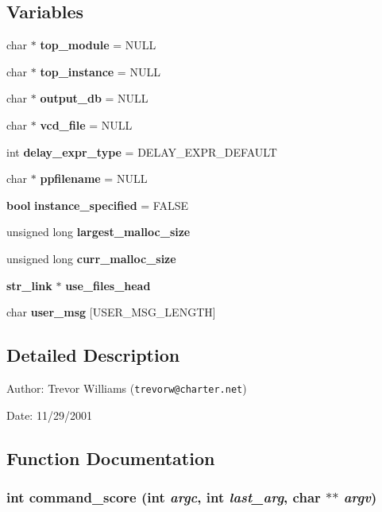 \subsection*{Variables}
\begin{CompactItemize}
\item 
char $\ast$ {\bf top\_\-module} = NULL
\item 
char $\ast$ {\bf top\_\-instance} = NULL
\item 
char $\ast$ {\bf output\_\-db} = NULL
\item 
char $\ast$ {\bf vcd\_\-file} = NULL
\item 
int {\bf delay\_\-expr\_\-type} = DELAY\_\-EXPR\_\-DEFAULT
\item 
char $\ast$ {\bf ppfilename} = NULL
\item 
{\bf bool} {\bf instance\_\-specified} = FALSE
\item 
unsigned long {\bf largest\_\-malloc\_\-size}
\item 
unsigned long {\bf curr\_\-malloc\_\-size}
\item 
{\bf str\_\-link} $\ast$ {\bf use\_\-files\_\-head}
\item 
char {\bf user\_\-msg} [USER\_\-MSG\_\-LENGTH]
\end{CompactItemize}


\subsection{Detailed Description}
\begin{Desc}
\item[Author:]Trevor Williams ({\tt trevorw@charter.net}) \end{Desc}
\begin{Desc}
\item[Date:]11/29/2001\end{Desc}


\subsection{Function Documentation}
\subsubsection{\setlength{\rightskip}{0pt plus 5cm}int command\_\-score (int {\em argc}, int {\em last\_\-arg}, char $\ast$$\ast$ {\em argv})}\label{score_8c_a15}


